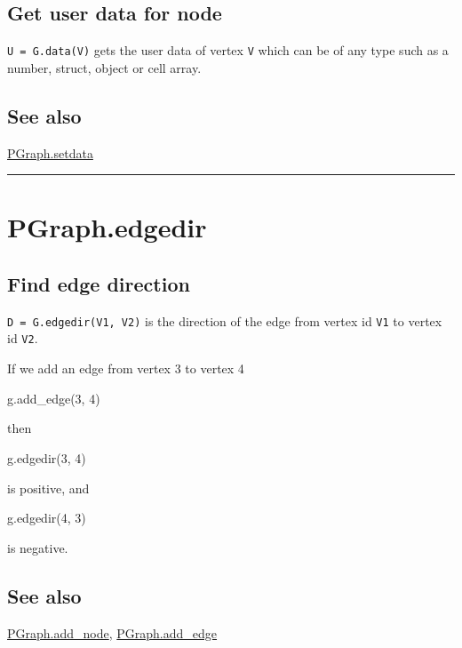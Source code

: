 \subsection*{Get user data for node}


\texttt{U = G.data(V)} gets the user data of vertex \texttt{V} which can be of any
type such as a number, struct, object or cell array.


\subsection*{See also}


\hyperlink{PGraph.setdata}{\color{blue} PGraph.setdata}

\vspace{1.5ex}\hrule

\hypertarget{PGraph.edgedir}{\section*{PGraph.edgedir}}
\subsection*{Find edge direction}


\texttt{D = G.edgedir(V1, V2)} is the direction of the edge from vertex id \texttt{V1}
to vertex id \texttt{V2}.



If we add an edge from vertex 3 to vertex 4

\begin{Code}
   g.add_edge(3, 4)
\end{Code}


then

\begin{Code}
   g.edgedir(3, 4)
\end{Code}


is positive, and

\begin{Code}
   g.edgedir(4, 3)
\end{Code}


is negative.


\subsection*{See also}


\hyperlink{PGraph.add_node}{\color{blue} PGraph.add\_node}, \hyperlink{PGraph.add_edge}{\color{blue} PGraph.add\_edge}

